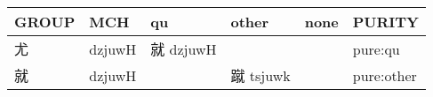 \documentclass[14pt,a4paper]{scrartcl}
\begin{document}
\begin{longtable}[c]{@{}llllll@{}}
\toprule
\begin{minipage}[b]{0.14\columnwidth}\raggedright\strut
GROUP
\strut\end{minipage} &
\begin{minipage}[b]{0.14\columnwidth}\raggedright\strut
MCH
\strut\end{minipage} &
\begin{minipage}[b]{0.14\columnwidth}\raggedright\strut
qu
\strut\end{minipage} &
\begin{minipage}[b]{0.14\columnwidth}\raggedright\strut
other
\strut\end{minipage} &
\begin{minipage}[b]{0.14\columnwidth}\raggedright\strut
none
\strut\end{minipage} &
\begin{minipage}[b]{0.14\columnwidth}\raggedright\strut
PURITY
\strut\end{minipage}\tabularnewline
\midrule
\endhead
\begin{minipage}[t]{0.14\columnwidth}\raggedright\strut
尤
\strut\end{minipage} &
\begin{minipage}[t]{0.14\columnwidth}\raggedright\strut
dzjuwH
\strut\end{minipage} &
\begin{minipage}[t]{0.14\columnwidth}\raggedright\strut
就 dzjuwH
\strut\end{minipage} &
\begin{minipage}[t]{0.14\columnwidth}\raggedright\strut
\strut\end{minipage} &
\begin{minipage}[t]{0.14\columnwidth}\raggedright\strut
\strut\end{minipage} &
\begin{minipage}[t]{0.14\columnwidth}\raggedright\strut
pure:qu
\strut\end{minipage}\tabularnewline
\begin{minipage}[t]{0.14\columnwidth}\raggedright\strut
就
\strut\end{minipage} &
\begin{minipage}[t]{0.14\columnwidth}\raggedright\strut
dzjuwH
\strut\end{minipage} &
\begin{minipage}[t]{0.14\columnwidth}\raggedright\strut
\strut\end{minipage} &
\begin{minipage}[t]{0.14\columnwidth}\raggedright\strut
蹴 tsjuwk
\strut\end{minipage} &
\begin{minipage}[t]{0.14\columnwidth}\raggedright\strut
\strut\end{minipage} &
\begin{minipage}[t]{0.14\columnwidth}\raggedright\strut
pure:other
\strut\end{minipage}\tabularnewline
\bottomrule
\end{longtable}
\end{document}
